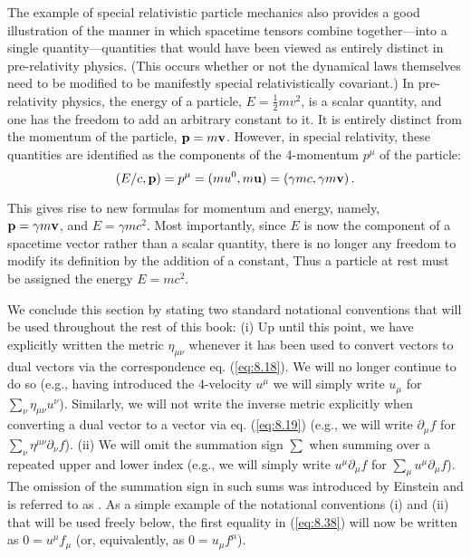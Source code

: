 The example of special relativistic particle mechanics also provides a good illustration of the manner in which spacetime tensors combine together---into a single quantity---quantities that would have been viewed as entirely distinct in pre-relativity physics. (This occurs whether or not the dynamical laws themselves need to be modified to be manifestly special relativistically covariant.) In pre-relativity physics, the energy of a particle, $E = \frac{1}{2} m v^2$, is a scalar quantity, and one has the freedom to add an arbitrary constant to it. It is entirely distinct from the momentum of the particle, $\vb{p} = m \vb{v}$. However, in special relativity, these quantities are identified as the components of the 4-momentum $p^\mu$ of the particle:
\begin{equation}\label{eq:8.39}
(E/c, \vb{p}) = p^\mu = (m u^0, m \vb{u}) = (\gamma m c, \gamma m \vb{v})\,.
\end{equation}

This gives rise to new formulas for momentum and energy, namely,\\$\vb{p} = \gamma m \vb{v}$, and $E = \gamma m c^2$. 
Most importantly, since $E$ is now the component of a spacetime vector rather than a scalar quantity, there is no longer any freedom to modify its definition by the addition of a constant, Thus a particle at rest must be assigned the energy $E = mc^2$.

We conclude this section by stating two standard notational conventions that will be used throughout the rest of this book: (i) Up until this point, we have explicitly written the metric $\eta_{\mu\nu}$ whenever it has been used to convert vectors to dual vectors via the correspondence eq. (\ref{eq:8.18}). We will no longer continue to do so (e.g., having introduced the 4-velocity $u^\mu$ we will simply write $u_\mu$ for $\sum_\nu \eta_{\mu \nu} u^\nu$). Similarly, we will not write the inverse metric explicitly when converting a dual vector to a vector via eq. (\ref{eq:8.19}) (e.g., we will write $\partial_\mu f$ for $\sum_\nu \eta^{\mu\nu} \partial_\nu f$). (ii) We will omit the summation sign $\sum$ when summing over a repeated upper and lower index (e.g., we will simply write $u^\mu \partial_\mu f$ for $\sum_\mu u^\mu \partial_\mu f$). The omission of the summation sign in such sums was introduced by Einstein and is referred to as . As a simple example of the notational conventions (i) and (ii) that will be used freely below, the first equality in (\ref{eq:8.38}) will now be written as $0 = u^\mu f_\mu$  (or, equivalently, as $0 = u_\mu f^\mu$). 

